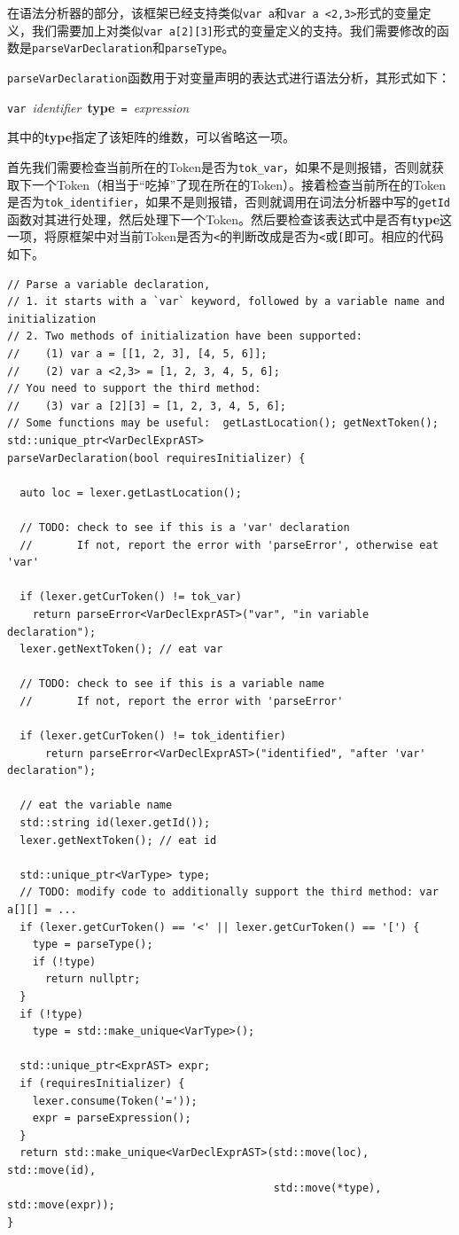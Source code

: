 \documentclass[lang=cn,11pt,a4paper]{elegantpaper}
\begin{document}
在语法分析器的部分，该框架已经支持类似\texttt{var a}和\texttt{var a <2,3>}形式的变量定义，我们需要加上对类似\texttt{var a[2][3]}形式的变量定义的支持。我们需要修改的函数是\texttt{parseVarDeclaration}和\texttt{parseType}。

\texttt{parseVarDeclaration}函数用于对变量声明的表达式进行语法分析，其形式如下：

\begin{center}
  \texttt{var}\ \textit{identifier}\ \textbf{type}\ \texttt{=}\ \textit{expression}
\end{center}

其中的\textbf{type}指定了该矩阵的维数，可以省略这一项。

首先我们需要检查当前所在的Token是否为\texttt{tok\_var}，如果不是则报错，否则就获取下一个Token（相当于“吃掉”了现在所在的Token）。接着检查当前所在的Token是否为\texttt{tok\_identifier}，如果不是则报错，否则就调用在词法分析器中写的\texttt{getId}函数对其进行处理，然后处理下一个Token。然后要检查该表达式中是否有\textbf{type}这一项，将原框架中对当前Token是否为\texttt{<}的判断改成是否为\texttt{<}或\texttt{[}即可。相应的代码如下。

\begin{lstlisting}
// Parse a variable declaration,
// 1. it starts with a `var` keyword, followed by a variable name and initialization
// 2. Two methods of initialization have been supported:
//    (1) var a = [[1, 2, 3], [4, 5, 6]];
//    (2) var a <2,3> = [1, 2, 3, 4, 5, 6];
// You need to support the third method:
//    (3) var a [2][3] = [1, 2, 3, 4, 5, 6];
// Some functions may be useful:  getLastLocation(); getNextToken();
std::unique_ptr<VarDeclExprAST>
parseVarDeclaration(bool requiresInitializer) {

  auto loc = lexer.getLastLocation();

  // TODO: check to see if this is a 'var' declaration
  //       If not, report the error with 'parseError', otherwise eat 'var'

  if (lexer.getCurToken() != tok_var)
    return parseError<VarDeclExprAST>("var", "in variable declaration");
  lexer.getNextToken(); // eat var

  // TODO: check to see if this is a variable name
  //       If not, report the error with 'parseError'

  if (lexer.getCurToken() != tok_identifier)
      return parseError<VarDeclExprAST>("identified", "after 'var' declaration");

  // eat the variable name
  std::string id(lexer.getId());
  lexer.getNextToken(); // eat id

  std::unique_ptr<VarType> type;
  // TODO: modify code to additionally support the third method: var a[][] = ...
  if (lexer.getCurToken() == '<' || lexer.getCurToken() == '[') {
    type = parseType();
    if (!type)
      return nullptr;
  }
  if (!type)
    type = std::make_unique<VarType>();

  std::unique_ptr<ExprAST> expr;
  if (requiresInitializer) {
    lexer.consume(Token('='));
    expr = parseExpression();
  }
  return std::make_unique<VarDeclExprAST>(std::move(loc), std::move(id),
                                          std::move(*type), std::move(expr));
}
\end{lstlisting}
\end{document}
